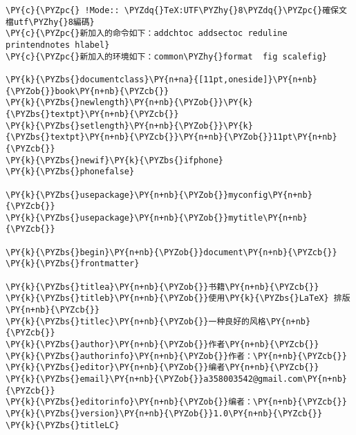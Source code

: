 \begin{Verbatim}[commandchars=\\\{\}]
\PY{c}{\PYZpc{} !Mode:: \PYZdq{}TeX:UTF\PYZhy{}8\PYZdq{}\PYZpc{}確保文檔utf\PYZhy{}8編碼}
\PY{c}{\PYZpc{}新加入的命令如下：addchtoc addsectoc reduline printendnotes hlabel}
\PY{c}{\PYZpc{}新加入的环境如下：common\PYZhy{}format  fig scalefig}

\PY{k}{\PYZbs{}documentclass}\PY{n+na}{[11pt,oneside]}\PY{n+nb}{\PYZob{}}book\PY{n+nb}{\PYZcb{}}
\PY{k}{\PYZbs{}newlength}\PY{n+nb}{\PYZob{}}\PY{k}{\PYZbs{}textpt}\PY{n+nb}{\PYZcb{}}
\PY{k}{\PYZbs{}setlength}\PY{n+nb}{\PYZob{}}\PY{k}{\PYZbs{}textpt}\PY{n+nb}{\PYZcb{}}\PY{n+nb}{\PYZob{}}11pt\PY{n+nb}{\PYZcb{}}
\PY{k}{\PYZbs{}newif}\PY{k}{\PYZbs{}ifphone}
\PY{k}{\PYZbs{}phonefalse}

\PY{k}{\PYZbs{}usepackage}\PY{n+nb}{\PYZob{}}myconfig\PY{n+nb}{\PYZcb{}}
\PY{k}{\PYZbs{}usepackage}\PY{n+nb}{\PYZob{}}mytitle\PY{n+nb}{\PYZcb{}}

\PY{k}{\PYZbs{}begin}\PY{n+nb}{\PYZob{}}document\PY{n+nb}{\PYZcb{}}
\PY{k}{\PYZbs{}frontmatter}

\PY{k}{\PYZbs{}titlea}\PY{n+nb}{\PYZob{}}书籍\PY{n+nb}{\PYZcb{}}
\PY{k}{\PYZbs{}titleb}\PY{n+nb}{\PYZob{}}使用\PY{k}{\PYZbs{}LaTeX} 排版\PY{n+nb}{\PYZcb{}}
\PY{k}{\PYZbs{}titlec}\PY{n+nb}{\PYZob{}}一种良好的风格\PY{n+nb}{\PYZcb{}}
\PY{k}{\PYZbs{}author}\PY{n+nb}{\PYZob{}}作者\PY{n+nb}{\PYZcb{}}
\PY{k}{\PYZbs{}authorinfo}\PY{n+nb}{\PYZob{}}作者：\PY{n+nb}{\PYZcb{}}
\PY{k}{\PYZbs{}editor}\PY{n+nb}{\PYZob{}}编者\PY{n+nb}{\PYZcb{}}
\PY{k}{\PYZbs{}email}\PY{n+nb}{\PYZob{}}a358003542@gmail.com\PY{n+nb}{\PYZcb{}}
\PY{k}{\PYZbs{}editorinfo}\PY{n+nb}{\PYZob{}}编者：\PY{n+nb}{\PYZcb{}}
\PY{k}{\PYZbs{}version}\PY{n+nb}{\PYZob{}}1.0\PY{n+nb}{\PYZcb{}}
\PY{k}{\PYZbs{}titleLC}
\end{Verbatim}
